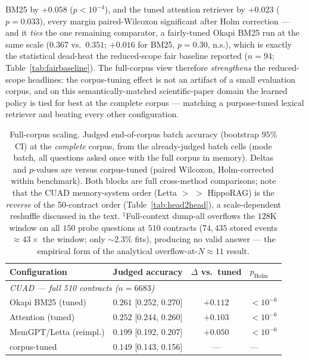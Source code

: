 BM25 by $+0.058$ ($p<10^{-4}$), and the tuned attention retriever by $+0.023$
($p{=}0.033$), every margin paired-Wilcoxon significant after Holm correction ---
and it \emph{ties} the one remaining comparator, a fairly-tuned Okapi BM25 run at
the same scale ($0.367$ vs.\ $0.351$; $+0.016$ for BM25, $p{=}0.30$, n.s.), which
is exactly the statistical dead-heat the reduced-scope fair baseline reported
($n{=}94$; Table~\ref{tab:fairbaseline}). The full-corpus view therefore
\emph{strengthens} the reduced-scope headlines: the corpus-tuning effect is not an
artifact of a small evaluation corpus, and on this semantically-matched
scientific-paper domain the learned policy is tied for best at the complete
corpus --- matching a purpose-tuned lexical retriever and beating every other
configuration.

\begin{table}[t]
\centering
\caption{Full-corpus scaling. Judged end-of-corpus batch accuracy (bootstrap
$95\%$ CI) at the \emph{complete} corpus, from the already-judged batch cells
(mode batch, all questions asked once with the full corpus in memory). Deltas and
$p$-values are versus \Vt{} corpus-tuned (paired Wilcoxon, Holm-corrected within
benchmark). Both blocks are full cross-method comparisons; note that the CUAD
memory-system order (Letta $>$ \Vt{} $>$ HippoRAG) is the \emph{reverse} of the
50-contract order (Table~\ref{tab:head2head}), a scale-dependent reshuffle
discussed in the text. $^{\ddagger}$Full-context dump-all overflows the $128$K
window on all $150$ probe questions at $510$ contracts ($74{,}435$ stored events
$\approx 43\times$ the window; only $\sim$2.3\% fits), producing no valid answer
--- the empirical form of the analytical overflow-at-$N{\approx}11$ result.}
\label{tab:fullcorpus}
\footnotesize
\begin{tabular}{lccl}
\toprule
Configuration & Judged accuracy & $\Delta$ vs.\ tuned & $p_{\mathrm{Holm}}$ \\
\midrule
\multicolumn{4}{l}{\emph{CUAD --- full 510 contracts ($n{=}6683$)}} \\
Okapi BM25 (tuned)     & $\mathbf{0.261}$ {\scriptsize[0.252, 0.270]} & $+0.112$ & $<10^{-6}$ \\
Attention (tuned)      & $0.252$ {\scriptsize[0.244, 0.260]} & $+0.103$ & $<10^{-6}$ \\
MemGPT/Letta (reimpl.) & $0.199$ {\scriptsize[0.192, 0.207]} & $+0.050$ & $<10^{-6}$ \\
\Vt{} corpus-tuned     & $0.149$ {\scriptsize[0.143, 0.156]} & --- & --- \\

\end{tabular}
\end{table}
